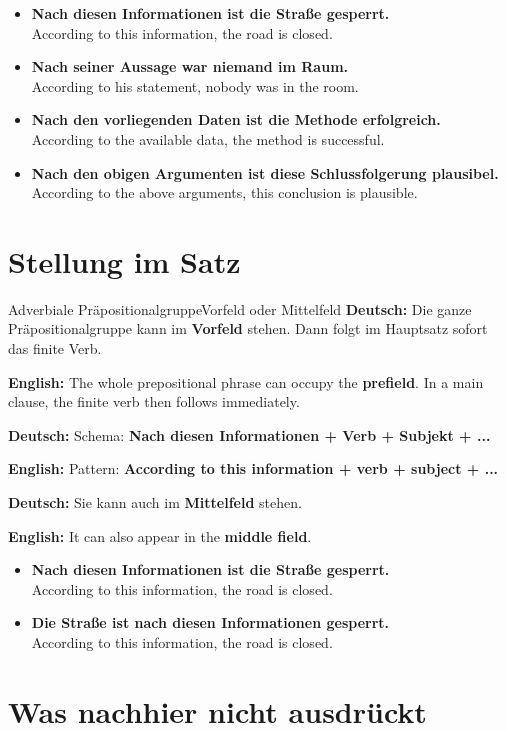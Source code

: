 \documentclass[a4paper,11pt]{article}
\newcommand{\GermanText}[1]{\textbf{Deutsch: }#1\par}
\newcommand{\EnglishText}[1]{{\small\color{SoftGray}\textbf{English: }#1\par}}
\newcommand{\ExampleItem}[2]{\item \textbf{#1}\\{\small\color{SoftGray}#2}}
\begin{document}
\begin{exbox}
\begin{itemize}
\ExampleItem{Nach diesen Informationen ist die Straße gesperrt.}{According to this information, the road is closed.}
\ExampleItem{Nach seiner Aussage war niemand im Raum.}{According to his statement, nobody was in the room.}
\ExampleItem{Nach den vorliegenden Daten ist die Methode erfolgreich.}{According to the available data, the method is successful.}
\ExampleItem{Nach den obigen Argumenten ist diese Schlussfolgerung plausibel.}{According to the above arguments, this conclusion is plausible.}
\end{itemize}
\end{exbox}

\section{Stellung im Satz}

\begin{grammarentry}{Adverbiale Präpositionalgruppe}{Vorfeld oder Mittelfeld}
\GermanText{Die ganze Präpositionalgruppe kann im \textbf{Vorfeld} stehen. Dann folgt im Hauptsatz sofort das finite Verb.}
\EnglishText{The whole prepositional phrase can occupy the \textbf{prefield}. In a main clause, the finite verb then follows immediately.}

\GermanText{Schema: \textbf{Nach diesen Informationen + Verb + Subjekt + ...}}
\EnglishText{Pattern: \textbf{According to this information + verb + subject + ...}}

\GermanText{Sie kann auch im \textbf{Mittelfeld} stehen.}
\EnglishText{It can also appear in the \textbf{middle field}.}
\end{grammarentry}

\begin{exbox}
\begin{itemize}
\ExampleItem{Nach diesen Informationen ist die Straße gesperrt.}{According to this information, the road is closed.}
\ExampleItem{Die Straße ist nach diesen Informationen gesperrt.}{According to this information, the road is closed.}
\end{itemize}
\end{exbox}

\section{Was \glqq nach\grqq hier nicht ausdrückt}
\end{document}
